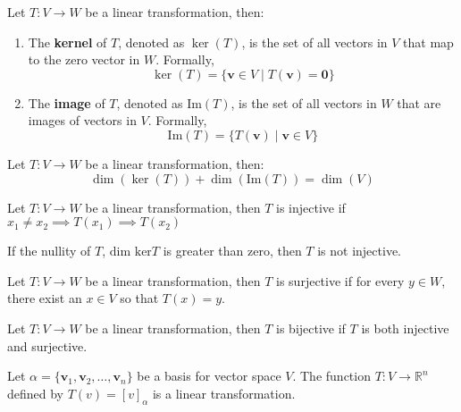 \documentclass[11pt]{article}
\begin{document}
\begin{definition}
    Let $T: V \rightarrow W$ be a linear transformation, then: 
    \begin{enumerate}
        \item The \textbf{kernel} of $T$, denoted as $\ker(T)$, is the set of all vectors in $V$ that map to the zero vector in $W$. Formally,
        \[
        \ker(T) = \{ \textbf{v} \in V \mid T(\textbf{v}) = \textbf{0} \}
        \]
        \item The \textbf{image} of $T$, denoted as $\text{Im}(T)$, is the set of all vectors in $W$ that are images of vectors in $V$. Formally,
        \[
        \text{Im}(T) = \{ T(\textbf{v}) \mid \textbf{v} \in V \}
        \]
    \end{enumerate}
\end{definition}
\begin{theorem}
    Let $T: V \rightarrow W$ be a linear transformation, then:
    \begin{equation}
        \dim(\ker(T)) + \dim(\text{Im}(T)) = \dim(V)
    \end{equation}
\end{theorem}
\begin{definition}[Injective LT]
    Let $T: V \rightarrow W$ be a linear transformation, then $T$ is injective if $x_1 \neq x_2 \implies T(x_1) \implies T(x_2)$
\end{definition}
\begin{theorem}
    If the nullity of $T$, $\text{dim ker} T$ is greater than zero, then $T$ is not injective.
\end{theorem}
\begin{definition}[Surjective]
    Let $T: V \rightarrow W$ be a linear transformation, then $T$ is surjective if for every $y \in W$, there exist an $x \in V$ so that $T(x) = y$.
\end{definition}
\begin{definition}[Bijective]
    Let $T: V \rightarrow W$ be a linear transformation, then $T$ is bijective if $T$ is both injective and surjective.
\end{definition}
\begin{theorem}
    Let $\alpha = \{\textbf{v}_1, \textbf{v}_2, \ldots, \textbf{v}_n\}$ be a basis for vector space $V$. The function $T: V \to \mathbb{R}^n$ defined by $T(v) = [v]_\alpha$ is a linear transformation.
\end{theorem}
\end{document}
